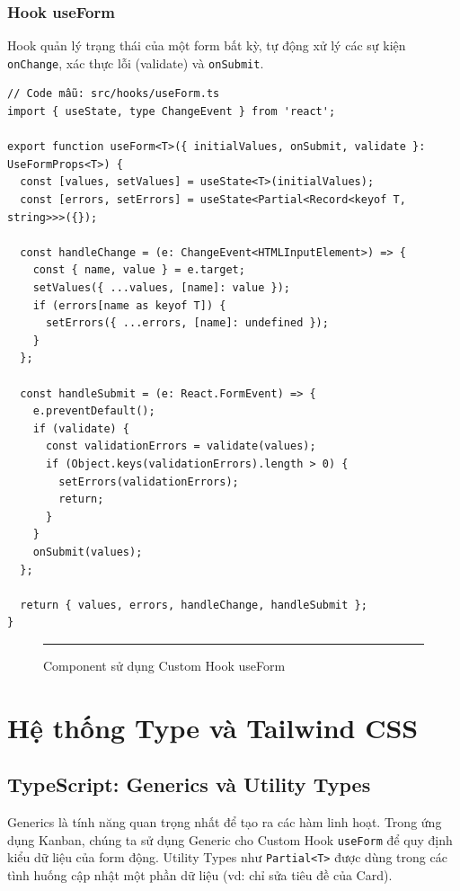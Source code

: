 \subsection{Hook useForm}
Hook quản lý trạng thái của một form bất kỳ, tự động xử lý các sự kiện \texttt{onChange}, xác thực lỗi (validate) và \texttt{onSubmit}.

\begin{Verbatim}
// Code mẫu: src/hooks/useForm.ts
import { useState, type ChangeEvent } from 'react';

export function useForm<T>({ initialValues, onSubmit, validate }: UseFormProps<T>) {
  const [values, setValues] = useState<T>(initialValues);
  const [errors, setErrors] = useState<Partial<Record<keyof T, string>>>({});

  const handleChange = (e: ChangeEvent<HTMLInputElement>) => {
    const { name, value } = e.target;
    setValues({ ...values, [name]: value });
    if (errors[name as keyof T]) {
      setErrors({ ...errors, [name]: undefined });
    }
  };

  const handleSubmit = (e: React.FormEvent) => {
    e.preventDefault();
    if (validate) {
      const validationErrors = validate(values);
      if (Object.keys(validationErrors).length > 0) {
        setErrors(validationErrors);
        return;
      }
    }
    onSubmit(values);
  };

  return { values, errors, handleChange, handleSubmit };
}
\end{Verbatim}

\begin{figure}[H]
    \centering
    \rule{0.6\textwidth}{0.4\textwidth}
    \caption{Component sử dụng Custom Hook useForm}
\end{figure}


\chapter{Hệ thống Type và Tailwind CSS}

\section{TypeScript: Generics và Utility Types}
Generics là tính năng quan trọng nhất để tạo ra các hàm linh hoạt. Trong ứng dụng Kanban, chúng ta sử dụng Generic cho Custom Hook \texttt{useForm} để quy định kiểu dữ liệu của form động. Utility Types như \texttt{Partial<T>} được dùng trong các tình huống cập nhật một phần dữ liệu (vd: chỉ sửa tiêu đề của Card).

